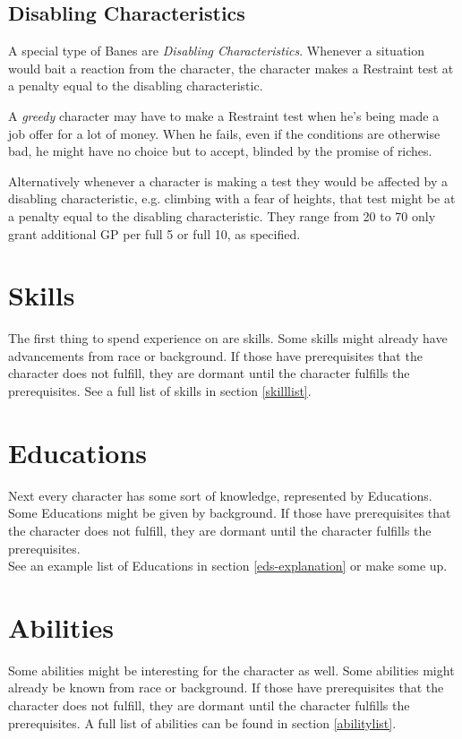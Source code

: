 \documentclass[12pt,a4paper,openany,usenames,dvipsnames]{book}
\begin{document}
	\subsection{Disabling Characteristics}
	A special type of Banes are \emph{Disabling Characteristics}.
	Whenever a situation would bait a reaction from the character,
		the character makes a Restraint test at a penalty equal to the disabling characteristic.
		\begin{exampleblock}
			A \emph{greedy} character may have to make a Restraint test
				when he's being made a job offer for a lot of money.
			When he fails, even if the conditions are otherwise bad,
				he might have no choice but to accept,
				blinded by the promise of riches.
		\end{exampleblock}
	Alternatively whenever a character is making a test they would be affected by a disabling characteristic, e.g. climbing with a fear of heights, that test might be at a penalty equal to the disabling characteristic. They range from 20 to 70 only grant additional GP per full 5 or full 10, as specified.

	\section{Skills}
	The first thing to spend experience on are skills. Some skills might already have advancements from race or background. If those have prerequisites that the character does not fulfill, they are dormant until the character fulfills the prerequisites. See a full list of skills in section \ref{skilllist}.
	\section{Educations}
	Next every character has some sort of knowledge, represented by Educations.
	Some Educations might be given by background.
	If those have prerequisites that the character does not fulfill,
		they are dormant until the character fulfills the prerequisites.\\
	See an example list of Educations in section \ref{eds-explanation} or make some up.
	\section{Abilities}
	Some abilities might be interesting for the character as well. Some abilities might already be known from race or background. If those have prerequisites that the character does not fulfill, they are dormant until the character fulfills the prerequisites. A full list of abilities can be found in section \ref{abilitylist}.
\end{document}
